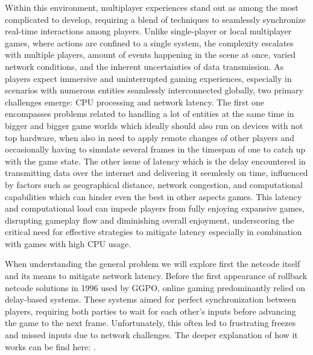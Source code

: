 Within this environment, multiplayer experiences stand out as among the most complicated to develop, requiring a blend of techniques to seamlessly synchronize real-time interactions among players. Unlike single-player or local multiplayer games, where actions are confined to a single system, the complexity escalates with multiple players, amount of events happening in the scene at once, varied network conditions, and the inherent uncertainties of data transmission. As players expect immersive and uninterrupted gaming experiences, especially in scenarios with numerous entities seamlessly interconnected globally, two primary challenges emerge: CPU processing and network latency. The first one encompasses problems related to handling a lot of entities at the same time in bigger and bigger game worlds which ideally should also run on devices with not top hardware, when also in need to apply remote changes of other players and occasionally having to simulate several frames in the timespan of one to catch up with the game state. The other issue of latency which is the delay encountered in transmitting data over the internet and delivering it seemlesly on time, influenced by factors such as geographical distance, network congestion, and computational capabilities which can hinder even the best in other aspects games. This latency and computational load can impede players from fully enjoying expansive games, disrupting gameplay flow and diminishing overall enjoyment, underscoring the critical need for effective strategies to mitigate latency especially in combination with games with high CPU usage.\newline

When understanding the general problem we will explore first the netcode itself and its means to mitigate network latency. Before the first appearance of rollback netcode solutions in 1996 used by GGPO, online gaming predominantly relied on delay-based systems. These systems aimed for perfect synchronization between players, requiring both parties to wait for each other's inputs before advancing the game to the next frame. Unfortunately, this often led to frustrating freezes and missed inputs due to network challenges. The deeper explanation of how it works can be find here: \cite{Delaybased_rollback_explanation}.

